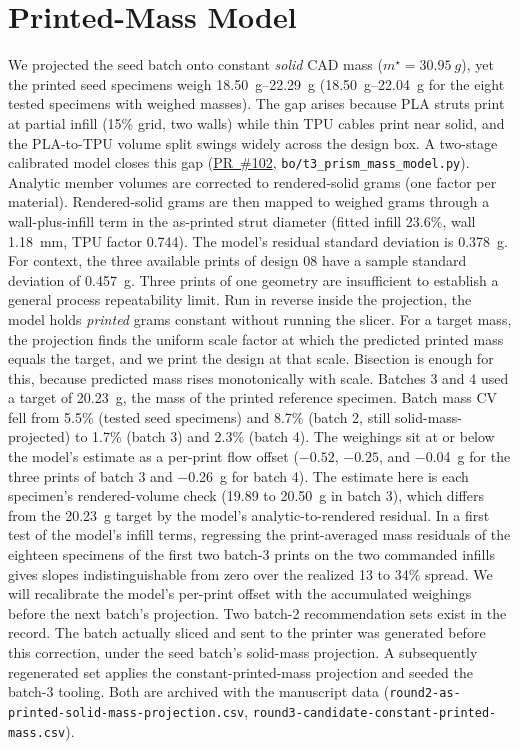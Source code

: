 \documentclass[11pt]{article}
\newcommand{\repo}{https://github.com/vertical-cloud-lab/tensegrity-optimization}
\begin{document}
\section{Printed-Mass Model}
\label{si:mass}
We projected the seed batch onto constant \emph{solid} CAD mass
($m^{\star} = \SI{30.95}{g}$), yet the printed seed specimens weigh
\SIrange{18.50}{22.29}{g} (\SIrange{18.50}{22.04}{g} for the eight
tested specimens with weighed masses). The gap arises because PLA struts
print at
partial infill (15\% grid, two walls) while thin TPU cables print near
solid, and the PLA-to-TPU volume split swings widely across the design
box. A two-stage calibrated model closes this gap
(\href{\repo/pull/102}{PR~\#102},
\texttt{bo/t3\_prism\_mass\_model.py}). Analytic member volumes are corrected
to rendered-solid grams (one factor per material). Rendered-solid grams
are then mapped to weighed grams through a wall-plus-infill term in the as-printed
strut diameter (fitted infill 23.6\%, wall \SI{1.18}{mm}, TPU factor 0.744).
The model's residual standard deviation is \SI{0.378}{g}. For context, the
three available prints of design 08 have a sample standard deviation of
\SI{0.457}{g}. Three prints of one geometry are insufficient to establish a
general process repeatability limit. Run in reverse inside the
projection, the model holds \emph{printed} grams constant without
running the slicer. For a target mass, the projection finds the
uniform scale factor at which the predicted printed mass equals the
target, and we print the design at that scale. Bisection is enough
for this, because predicted mass rises monotonically with scale.
Batches 3 and 4 used a target of \SI{20.23}{g}, the mass of the
printed reference specimen. Batch mass CV
fell from 5.5\% (tested seed specimens) and 8.7\% (batch 2, still
solid-mass-projected) to 1.7\% (batch 3) and 2.3\% (batch 4). The
weighings sit at or below the model's estimate as a per-print flow
offset ($-0.52$, $-0.25$, and \SI{-0.04}{g} for the three prints of
batch 3 and \SI{-0.26}{g} for batch 4). The estimate here is each
specimen's rendered-volume check (19.89 to \SI{20.50}{g} in batch 3),
which differs from the \SI{20.23}{g} target by the model's
analytic-to-rendered residual. In a first test of the
model's infill terms, regressing the print-averaged mass
residuals of the eighteen specimens of the first two batch-3 prints on the two commanded
infills gives slopes indistinguishable from zero over the realized
13 to 34\% spread. We will recalibrate the model's per-print offset with the
accumulated weighings before the next batch's projection. Two batch-2
recommendation sets exist in the record.
The batch actually sliced and sent to the printer was generated
before this correction, under the seed batch's solid-mass
projection. A subsequently regenerated set applies the
constant-printed-mass projection and seeded the batch-3 tooling.
Both are archived with the manuscript data
(\texttt{round2-as-printed-solid-mass-projection.csv},
\texttt{round3-candidate-constant-printed-mass.csv}).
\end{document}
